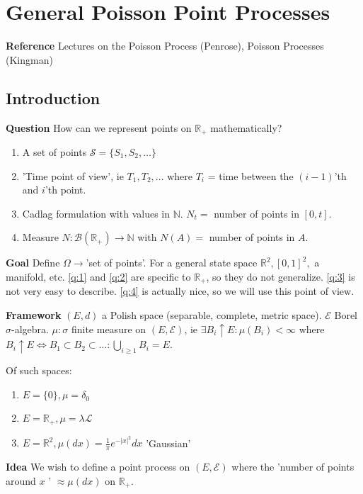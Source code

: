 \chapter{General Poisson Point Processes}
\textbf{Reference} Lectures on the Poisson Process (Penrose), Poisson Processes (Kingman)

\section{Introduction}
\textbf{Question} How can we represent points on $\mathbb{R}_+$ mathematically?
\begin{enumerate}
	\item A set of points $\mathcal{S}=\{S_1, S_2, \ldots \}$ \label{q:3}
	\item 'Time point of view', ie $T_1,T_2, \ldots $ where $T_i$ = time between the $(i-1) $'th and $i $'th point. \label{q:1}
	\item Cadlag formulation with values in $ \mathbb{N}$. $N_t=$ number of points in $[0,t]$. \label{q:2}
	\item Measure $N: \mathcal{B}(\mathbb{R}_+) \to \mathbb{N}$ with $N(A)=$ number of points in $A$. \label{q:4}
\end{enumerate}
\textbf{Goal} Define $\Omega \to $'set of points'. For a general state space $\mathbb{R}^2, [0,1]^2,$ a manifold, etc. 
\ref{q:1} and \ref{q:2} are specific to $\mathbb{R}_+$, so they do not generalize. \ref{q:3} is not very easy to describe. \ref{q:4} is actually nice, so we will  use this point of view.

\textbf{Framework} $(E,d)$ a Polish space (separable, complete, metric space). $\mathcal{E}$ Borel $\sigma$-algebra. $\mu: \sigma$ finite measure on $(E, \mathcal{E})$, ie  $\exists  B_i \uparrow E: \mu(B_i)<\infty$ where $B_i \uparrow E \iff B_1 \subset B_2 \subset \ldots : \bigcup_{i\geq 1}B_i=E$.

\begin{ex}[] Of such spaces: 
\begin{enumerate}
	\item $E=\{0\}, \mu = \delta_0$
	\item $E=\mathbb{R}_+, \mu = \lambda \mathcal{L}$
	\item $E=\mathbb{R}^2, \mu(dx)=\frac{1}{\pi} e^{- |x|^2}dx$ 'Gaussian'
\end{enumerate}
\end{ex}

\textbf{Idea} We wish to define a point process on $(E, \mathcal{E})$ where the 'number of points around $x$ ' $\approx \mu(dx)$ on $\mathbb{R}_+$. 

